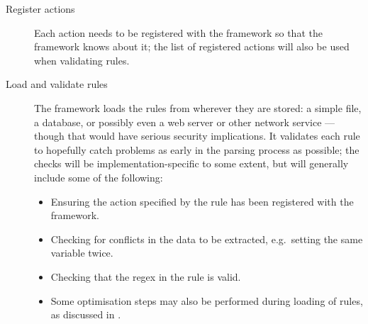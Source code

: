 \begin{description}

    \item [Register actions]  Each action needs to be registered with the
        framework so that the framework knows about it; the list of
        registered actions will also be used when validating rules.

    \item [Load and validate rules]  The framework loads the rules from
        wherever they are stored: a simple file, a database, or possibly
        even a web server or other network service --- though that would
        have serious security implications.  It validates each rule to
        hopefully catch problems as early in the parsing process as
        possible; the checks will be implementation-specific to some
        extent, but will generally include some of the following:

        \begin{itemize}

            \squeezeitems{}

            \item Ensuring the action specified by the rule has been
                registered with the framework.

            \item Checking for conflicts in the data to be extracted, e.g.\
                setting the same variable twice.

            \item Checking that the regex in the rule is valid.

            \item Some optimisation steps may also be performed during
                loading of rules, as discussed in \sectionref{parser
                efficiency}.

        \end{itemize}


\end{description}
